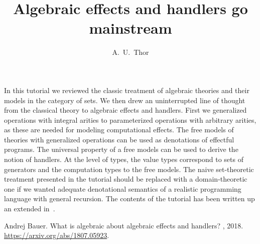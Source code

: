 \documentclass[a4paper,UKenglish]{dagrep-v2018}
\begin{document}
\subject{Report from Dagstuhl Seminar 18172}

\title{Algebraic effects and handlers go mainstream}

\author[1]{A.~U.~Thor}

\maketitle

\license

In this tutorial we reviewed the classic treatment of algebraic theories and
their models in the category of sets. We then drew an uninterrupted line of
thought from the classical theory to algebraic effects and handlers. First we
generalized operations with integral arities to parameterized operations with
arbitrary arities, as these are needed for modeling computational effects. The
free models of theories with generalized operations can be used as denotations
of effectful programs. The universal property of a free models can be used to
derive the notion of handlers. At the level of types, the value types correspond
to sets of generators and the computation types to the free models. The naive
set-theoretic treatment presented in the tutorial should be replaced with a
domain-theoretic one if we wanted adequate denotational semantics of a realistic
programming language with general recursion. The contents of the tutorial has
been written up an extended in~\cite{bauer18:_what}.

\begin{thebibliography}{10}

Andrej Bauer.
\newblock What is algebraic about algebraic effects and handlers?
, 2018.
\newblock \url{https://arxiv.org/abs/1807.05923}.

\end{thebibliography}




\license
\end{document}
